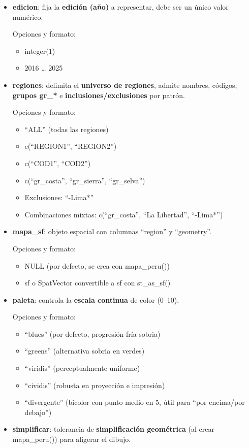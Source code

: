 \documentclass[
  11pt,
  letterpaper,
  DIV=11,
  numbers=noendperiod]{scrartcl}
\begin{document}
\begin{itemize}
\item
  \textbf{edicion}: fija la \textbf{edición (año)} a representar, debe
  ser un único valor numérico.

  Opciones y formato:

  \begin{itemize}
  \item
    integer(1)
  \item
    2016 \ldots{} 2025
  \end{itemize}
\item
  \textbf{regiones}: delimita el \textbf{universo de regiones}, admite
  nombres, códigos, \textbf{grupos gr\_*} e
  \textbf{inclusiones/exclusiones} por patrón.

  Opciones y formato:

  \begin{itemize}
  \item
    ``ALL'' (todas las regiones)
  \item
    c(``REGION1'', ``REGION2'')
  \item
    c(``COD1'', ``COD2'')
  \item
    c(``gr\_costa'', ``gr\_sierra'', ``gr\_selva'')
  \item
    Exclusiones: ``-Lima*''
  \item
    Combinaciones mixtas: c(``gr\_costa'', ``La Libertad'', ``-Lima*'')
  \end{itemize}
\item
  \textbf{mapa\_sf}: objeto espacial con columnas ``region'' y
  ``geometry''.

  Opciones y formato:

  \begin{itemize}
  \item
    NULL (por defecto, se crea con mapa\_peru())
  \item
    sf o SpatVector convertible a sf con st\_as\_sf()
  \end{itemize}
\item
  \textbf{paleta}: controla la \textbf{escala continua} de color
  (0--10).

  Opciones y formato:

  \begin{itemize}
  \item
    ``blues'' (por defecto, progresión fría sobria)
  \item
    ``greens'' (alternativa sobria en verdes)
  \item
    ``viridis'' (perceptualmente uniforme)
  \item
    ``cividis'' (robusta en proyección e impresión)
  \item
    ``divergente'' (bicolor con punto medio en 5, útil para ``por
    encima/por debajo'')
  \end{itemize}
\item
  \textbf{simplificar}: tolerancia de \textbf{simplificación geométrica}
  (al crear mapa\_peru()) para aligerar el dibujo.


\end{itemize}
\end{document}
